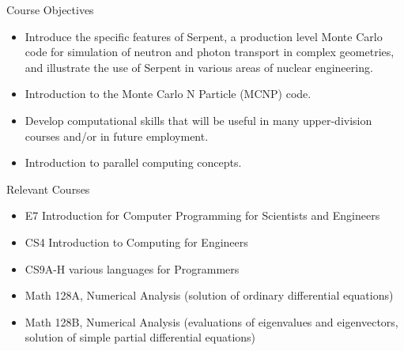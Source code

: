 \documentclass[xcolor=x11names,compress]{beamer}
\renewcommand{\(}{\begin{columns}}
\renewcommand{\)}{\end{columns}}
\newcommand{\<}[1]{\begin{column}{#1}}
\renewcommand{\>}{\end{column}}
\begin{document}
\begin{frame}{Course Objectives}
\begin{itemize}
\item Introduce the specific features of Serpent, a production level Monte Carlo code for simulation of neutron and photon transport in complex geometries, and illustrate the use of Serpent in various areas of nuclear engineering.
\item Introduction to the Monte Carlo N Particle (MCNP) code.
\item Develop computational skills that will be useful in many upper-division courses and/or in future employment.%
\item Introduction to parallel computing concepts.
\end{itemize}
\end{frame}

\begin{frame}{Relevant Courses}
\begin{itemize}
\item E7 Introduction for Computer Programming for Scientists and Engineers
\item CS4 Introduction to Computing for Engineers
\item CS9A-H various languages for Programmers
\item Math 128A, Numerical Analysis (solution of ordinary differential equations)
\item Math 128B, Numerical Analysis (evaluations of eigenvalues and eigenvectors, solution of simple partial differential equations)
\end{itemize}
\end{frame}
\end{document}
